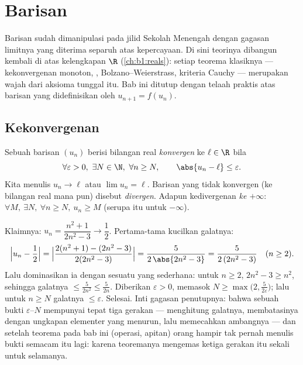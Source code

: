 \chapter{Barisan}\label{ch:b1:seq}

Barisan sudah dimanipulasi pada jilid Sekolah Menengah dengan gagasan
limitnya yang diterima separuh atas kepercayaan. Di sini teorinya dibangun kembali di atas
kelengkapan $\R$ (\cref{ch:b1:reals}): setiap teorema klasiknya
--- kekonvergenan monoton, , Bolzano--Weierstrass,
kriteria Cauchy --- merupakan wajah dari aksioma tunggal itu. Bab ini
ditutup dengan telaah praktis atas barisan yang didefinisikan oleh $u_{n+1} =
f(u_n)$.

\section{Kekonvergenan}

\begin{definition}\label{def:b1:seq:limit}
Sebuah barisan $(u_n)$ berisi bilangan real \emph{konvergen} ke $\ell \in \R$
bila
\[
\forall \varepsilon > 0,\ \exists N \in \N,\ \forall n \geq N,
\qquad \abs{u_n - \ell} \leq \varepsilon .
\]
Kita menulis $u_n \to \ell$ atau $\lim u_n = \ell$. Barisan yang tidak
konvergen (ke bilangan real mana pun) disebut \emph{divergen}. Adapun kedivergenan \emph{ke
$+\infty$}: $\forall M,\ \exists N,\ \forall n \geq N,\ u_n \geq M$
(serupa itu untuk $-\infty$).
\end{definition}

\begin{example}\label{ex:b1:seq:epsilonN}
Klaimnya: $u_n = \dfrac{n^2 + 1}{2n^2 - 3} \to \dfrac12$. Pertama-tama
kucilkan galatnya:
\[
\Bigl| u_n - \frac12 \Bigr|
= \Bigl| \frac{2(n^2 + 1) - (2n^2 - 3)}{2(2n^2 - 3)} \Bigr|
= \frac{5}{2\,\abs{2n^2 - 3}}
= \frac{5}{2\,(2n^2 - 3)} \quad (n \geq 2).
\]
Lalu dominasikan ia dengan sesuatu yang sederhana: untuk $n \geq 2$, $2n^2 - 3
\geq n^2$, sehingga galatnya $\leq \frac{5}{2n^2} \leq \frac 5{2n}$.
Diberikan $\varepsilon > 0$,  memasok $N \geq
\max\bigl(2, \frac{5}{2\varepsilon}\bigr)$; lalu untuk $n \geq N$
galatnya $\leq \varepsilon$. Selesai. Inti gagasan penutupnya: bahwa sebuah bukti
$\varepsilon$--$N$ mempunyai tepat tiga gerakan --- menghitung
galatnya, membatasinya dengan ungkapan elementer yang menurun, lalu memecahkan
ambangnya --- dan setelah teorema pada bab ini (operasi,
apitan) orang hampir tak pernah menulis bukti semacam itu lagi: karena teoremanya
mengemas ketiga gerakan itu sekali untuk selamanya.
\end{example}

